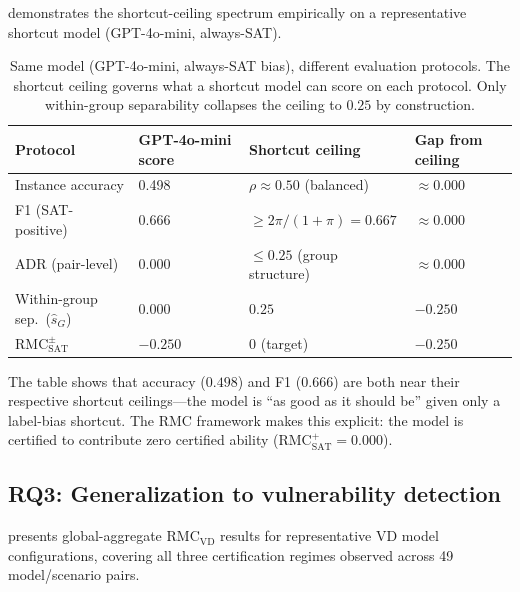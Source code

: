\documentclass[conference]{IEEEtran}
\theoremstyle{remark}
\newcommand{\RMCSAT}{\mathrm{RMC}_{\mathrm{SAT}}}
\newcommand{\RMCVD}{\mathrm{RMC}_{\mathrm{VD}}}
\newcommand{\shat}{\hat{s}_G}
\begin{document}
 demonstrates the shortcut-ceiling spectrum empirically on a representative shortcut model (GPT-4o-mini, always-SAT).

\begin{table}[ht]
\centering
\caption{Same model (GPT-4o-mini, always-SAT bias), different evaluation protocols.
The shortcut ceiling governs what a shortcut model can score on each protocol.
Only within-group separability collapses the ceiling to $0.25$ by construction.}
\label{tab:spectrum}
\renewcommand{\arraystretch}{1.2}
\small
\begin{tabularx}{\columnwidth}{p{1.8cm}p{1.6cm}p{2.1cm}X}
\toprule
Protocol & GPT-4o-mini score & Shortcut ceiling & Gap from ceiling \\
\midrule
Instance accuracy & 0.498 & $\rho\approx0.50$ (balanced) & $\approx0.000$ \\
F1 (SAT-positive) & 0.666 & $\ge2\pi/(1+\pi)=0.667$ & $\approx0.000$ \\
ADR (pair-level) & 0.000 & $\le0.25$ (group structure) & $\approx0.000$ \\
Within-group sep.\ ($\shat$) & 0.000 & $0.25$ & $-0.250$ \\
$\RMCSAT^{\pm}$ & $-0.250$ & $0$ (target) & $-0.250$ \\
\bottomrule
\end{tabularx}
\end{table}

The table shows that accuracy ($0.498$) and F1 ($0.666$) are both near their respective shortcut ceilings---the model is ``as good as it should be'' given only a label-bias shortcut.
The RMC framework makes this explicit: the model is certified to contribute zero certified ability ($\RMCSAT^{+}=0.000$).

\subsection{RQ3: Generalization to vulnerability detection}
\label{sec:vd_results}

 presents global-aggregate $\RMCVD$ results for representative VD model configurations, covering all three certification regimes observed across 49 model/scenario pairs.
\end{document}
